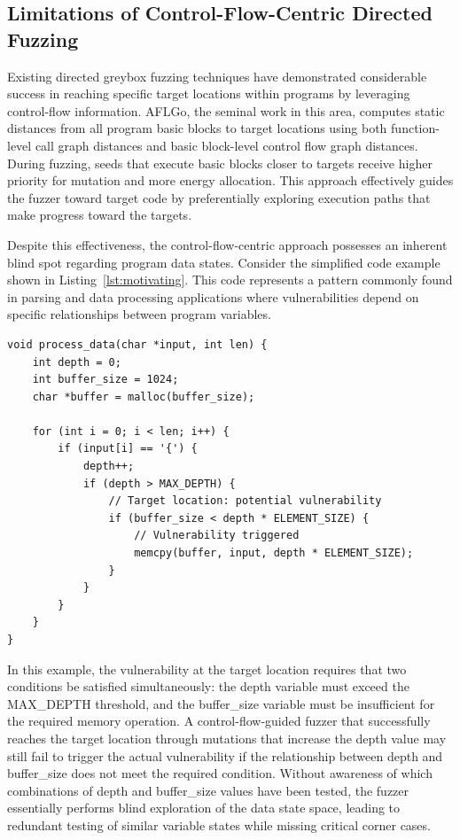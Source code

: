 \documentclass[review]{elsarticle}
\begin{document}
\subsection{Limitations of Control-Flow-Centric Directed Fuzzing}

Existing directed greybox fuzzing techniques have demonstrated considerable success in reaching specific target locations within programs by leveraging control-flow information. AFLGo, the seminal work in this area, computes static distances from all program basic blocks to target locations using both function-level call graph distances and basic block-level control flow graph distances. During fuzzing, seeds that execute basic blocks closer to targets receive higher priority for mutation and more energy allocation. This approach effectively guides the fuzzer toward target code by preferentially exploring execution paths that make progress toward the targets.

Despite this effectiveness, the control-flow-centric approach possesses an inherent blind spot regarding program data states. Consider the simplified code example shown in Listing~\ref{lst:motivating}. This code represents a pattern commonly found in parsing and data processing applications where vulnerabilities depend on specific relationships between program variables.

\begin{lstlisting}[caption={Motivating example: data-dependent vulnerability},label=lst:motivating,float=t]
void process_data(char *input, int len) {
    int depth = 0;
    int buffer_size = 1024;
    char *buffer = malloc(buffer_size);
    
    for (int i = 0; i < len; i++) {
        if (input[i] == '{') {
            depth++;
            if (depth > MAX_DEPTH) {
                // Target location: potential vulnerability
                if (buffer_size < depth * ELEMENT_SIZE) {
                    // Vulnerability triggered
                    memcpy(buffer, input, depth * ELEMENT_SIZE);
                }
            }
        }
    }
}
\end{lstlisting}

In this example, the vulnerability at the target location requires that two conditions be satisfied simultaneously: the depth variable must exceed the MAX\_DEPTH threshold, and the buffer\_size variable must be insufficient for the required memory operation. A control-flow-guided fuzzer that successfully reaches the target location through mutations that increase the depth value may still fail to trigger the actual vulnerability if the relationship between depth and buffer\_size does not meet the required condition. Without awareness of which combinations of depth and buffer\_size values have been tested, the fuzzer essentially performs blind exploration of the data state space, leading to redundant testing of similar variable states while missing critical corner cases.
\end{document}
